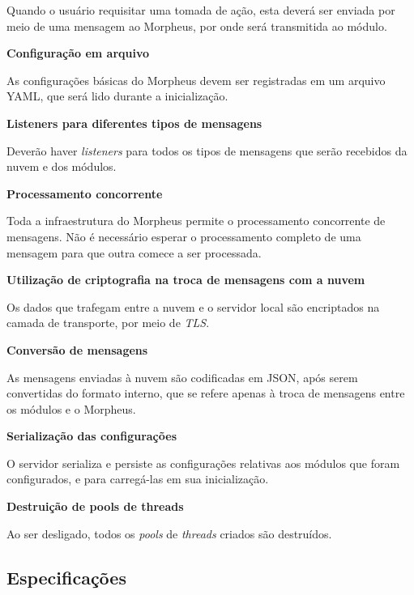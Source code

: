 \begin{description}
Quando o usuário requisitar uma tomada de ação, esta deverá ser enviada por meio de uma mensagem ao Morpheus, por onde será transmitida ao módulo.

\item \textbf{Configuração em arquivo}

As configurações básicas do Morpheus devem ser registradas em um arquivo YAML, que será lido durante a inicialização.

\item \textbf{Listeners para diferentes tipos de mensagens}

Deverão haver \emph{listeners} para todos os tipos de mensagens que serão recebidos da nuvem e dos módulos.

\item \textbf{Processamento concorrente}

Toda a infraestrutura do Morpheus permite o processamento concorrente de mensagens. Não é necessário esperar o processamento completo de uma mensagem para que outra comece a ser processada.

\item \textbf{Utilização de criptografia na troca de mensagens com a nuvem}

Os dados que trafegam entre a nuvem e o servidor local são encriptados na camada de transporte, por meio de \emph{TLS}.

\item \textbf{Conversão de mensagens}

As mensagens enviadas à nuvem são codificadas em JSON, após serem convertidas do formato interno, que se refere apenas à troca de mensagens entre os módulos e o Morpheus.

\item \textbf{Serialização das configurações}

O servidor serializa e persiste as configurações relativas aos módulos que foram configurados, e para carregá-las em sua inicialização.

\item \textbf{Destruição de pools de threads}

Ao ser desligado, todos os \emph{pools} de \emph{threads} criados são destruídos.

\end{description}

\subsection{Especificações}

